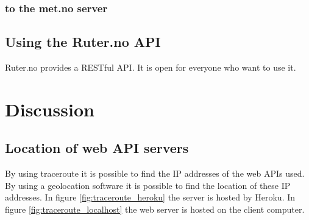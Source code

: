 \documentclass[10pt,a4paper]{article}
\begin{document}
\subsubsection{to the met.no server}
\label{sec:met.no-api}





\subsection{Using the Ruter.no API}

\label{sec:using-ruter.no-api}
Ruter.no provides a RESTful API. It is open for everyone who want to use it. 

\section{Discussion}

\subsection{Location of web API servers}
By using traceroute it is possible to find the IP addresses of the web APIs used. By using a geolocation software it is possible to find the location of these IP addresses. In figure \ref{fig:traceroute_heroku} the server is hosted by Heroku. In figure \ref{fig:traceroute_localhost} the web server is hosted on the client computer. 
\end{document}
